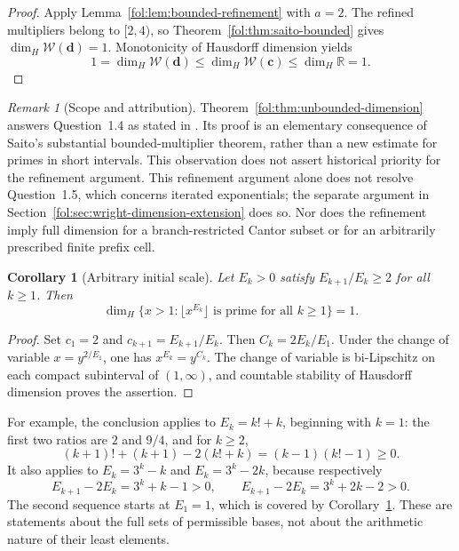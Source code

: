 \documentclass[11pt,a4paper]{article}
\newtheorem{corollary}[theorem]{Corollary}
\theoremstyle{definition}
\theoremstyle{remark}
\newtheorem{remark}[theorem]{Remark}
\numberwithin{equation}{section}
\begin{document}
\begin{proof}
Apply Lemma~\ref{fol:lem:bounded-refinement} with $a=2$. The refined multipliers
belong to $[2,4)$, so Theorem~\ref{fol:thm:saito-bounded} gives
$\dim_H\mathcal W(\mathbf d)=1$. Monotonicity of Hausdorff dimension yields
\[
 1=\dim_H\mathcal W(\mathbf d)
 \le\dim_H\mathcal W(\mathbf c)\le\dim_H\mathbb R=1.
\]
\end{proof}

\begin{remark}[Scope and attribution]\label{fol:rem:dimension-scope}
Theorem~\ref{fol:thm:unbounded-dimension} answers Question~1.4 as stated in
\cite[arXiv version]{SaitoDimension2021}. Its proof is an elementary
consequence of Saito's substantial bounded-multiplier theorem, rather than
a new estimate for primes in short intervals. This observation does not
assert historical priority for the refinement argument. This refinement argument alone does not resolve
Question~1.5, which concerns iterated exponentials; the separate
argument in Section~\ref{fol:sec:wright-dimension-extension} does so.
Nor does the refinement imply full dimension for a branch-restricted
Cantor subset or for an arbitrarily prescribed finite prefix cell.
\end{remark}

\begin{corollary}[Arbitrary initial scale]\label{fol:cor:arbitrary-initial-scale}
Let $E_k>0$ satisfy $E_{k+1}/E_k\ge2$ for all $k\ge1$. Then
\[
 \dim_H\{x>1:\lfloor x^{E_k}\rfloor\text{ is prime for all }k\ge1\}=1.
\]
\end{corollary}

\begin{proof}
Set $c_1=2$ and $c_{k+1}=E_{k+1}/E_k$. Then
$C_k=2E_k/E_1$. Under the change of variable $x=y^{2/E_1}$,
one has $x^{E_k}=y^{C_k}$. The change of variable is bi-Lipschitz on
each compact subinterval of $(1,\infty)$, and countable stability of
Hausdorff dimension proves the assertion.
\end{proof}

For example, the conclusion applies to $E_k=k!+k$, beginning with $k=1$:
the first two ratios are $2$ and $9/4$, and for $k\ge2$,
\[
 (k+1)!+(k+1)-2(k!+k)=(k-1)(k!-1)\ge0.
\]
It also applies to $E_k=3^k-k$ and $E_k=3^k-2k$, because respectively
\[
 E_{k+1}-2E_k=3^k+k-1>0,
 \qquad
 E_{k+1}-2E_k=3^k+2k-2>0.
\]
The second sequence starts at $E_1=1$, which is covered by
Corollary~\ref{fol:cor:arbitrary-initial-scale}.
These are statements about the full sets of permissible
bases, not about the arithmetic nature of their least elements.
\end{document}
